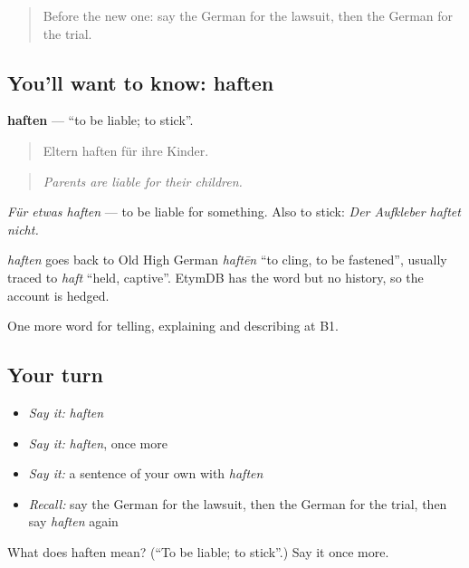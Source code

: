 \begin{quote}
Before the new one: say the German for the lawsuit, then the German for the trial.
\end{quote}

\subsection*{You'll want to know: haften}
\textbf{haften} — \textquotedblleft{}to be liable; to stick\textquotedblright{}.

\begin{quote}
Eltern haften für ihre Kinder.
\end{quote}

\begin{quote}
\emph{Parents are liable for their children.}
\end{quote}

\emph{Für etwas haften} — to be liable for something. Also to stick: \emph{Der Aufkleber haftet nicht.}

\begin{cousinweb}
\emph{haften} goes back to Old High German \emph{haftēn} \textquotedblleft{}to cling, to be fastened\textquotedblright{}, usually traced to \emph{haft} \textquotedblleft{}held, captive\textquotedblright{}. EtymDB has the word but no history, so the account is hedged.
\end{cousinweb}

\begin{grammarlens}[title={What you've built}]
One more word for telling, explaining and describing at B1.
\end{grammarlens}

\subsection*{Your turn}
\begin{itemize}
\raggedright
  \item \emph{Say it:} \emph{haften}
  \item \emph{Say it:} \emph{haften}, once more
  \item \emph{Say it:} a sentence of your own with \emph{haften}
  \item \emph{Recall:} say the German for the lawsuit, then the German for the trial, then say \emph{haften} again
\end{itemize}

\begin{tcolorbox}[breakable,colback=teal!4,colframe=teal!35!black,title={Before you move on}]
What does haften mean? (\textquotedblleft{}To be liable; to stick\textquotedblright{}.) Say it once more.
\end{tcolorbox}
